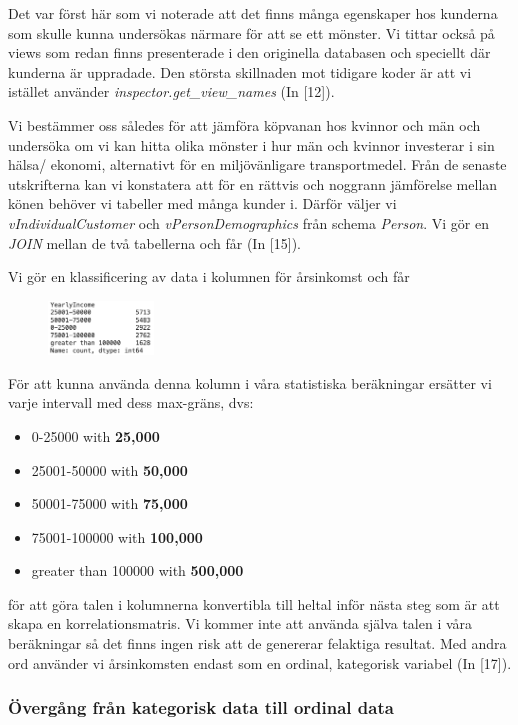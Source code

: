 \documentclass[10pt]{article}
\begin{document}
Det var först här som vi noterade att det finns många egenskaper hos kunderna som skulle kunna undersökas närmare för att se ett mönster. Vi tittar också på views som redan finns presenterade i den originella databasen och speciellt där kunderna är uppradade. Den största skillnaden mot tidigare koder är att vi istället använder \emph{inspector.get\_view\_names} (In [12]).

Vi bestämmer oss således för att jämföra köpvanan hos kvinnor och män och undersöka om vi kan hitta olika mönster i hur män och kvinnor investerar i sin hälsa/ ekonomi, alternativt för en miljövänligare transportmedel. Från de senaste utskrifterna kan vi konstatera att för en rättvis och noggrann jämförelse mellan könen behöver vi tabeller med många kunder i. Därför väljer vi \emph{vIndividualCustomer} och \emph{vPersonDemographics} från schema \emph{Person}. Vi gör en \emph{JOIN} mellan de två tabellerna och får (In [15]).

Vi gör en klassificering av data i kolumnen för årsinkomst och får
\begin{figure}[h]
    \centering
    \includegraphics[width=0.25\textwidth]{img_yearly_income.png}
\end{figure}

För att kunna använda denna kolumn i våra statistiska beräkningar ersätter vi varje intervall med dess max-gräns, dvs:
\begin{itemize}[topsep=10pt, partopsep=0pt, itemsep=0.2em, parsep=0pt]
	\item[] 0-25000 with \textbf{25,000}
	\item[] 25001-50000 with \textbf{50,000}
	\item[] 50001-75000 with \textbf{75,000}
	\item[] 75001-100000 with \textbf{100,000}
	\item[] greater than 100000 with \textbf{500,000}
\end{itemize}
för att göra talen i kolumnerna konvertibla till heltal inför nästa steg som är att skapa en korrelationsmatris. Vi kommer inte att använda själva talen i våra beräkningar så det finns ingen risk att de genererar felaktiga resultat. Med andra ord använder vi årsinkomsten endast som en ordinal, kategorisk variabel (In [17]).

\subsubsection{Övergång från kategorisk data till ordinal data}
\end{document}
